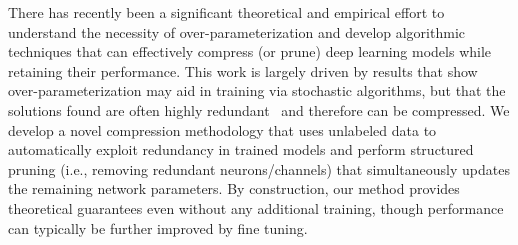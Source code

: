





There has recently been a significant theoretical and empirical effort to understand the necessity of over-parameterization and develop algorithmic techniques that can effectively compress (or prune) deep learning models while retaining their performance. This work is largely driven by results that show over-parameterization may aid in training via stochastic algorithms, but that the solutions found are often highly redundant~\cite{frankle2018lottery,frankle2020linear,jaderberg2014speeding,luo2017thinet} and therefore can be compressed. We develop a novel compression methodology that uses unlabeled data to automatically exploit redundancy in trained models and perform structured pruning (i.e., removing redundant neurons/channels) that simultaneously updates the remaining network parameters. By construction, our method provides theoretical guarantees even without any additional training, though performance can typically be further improved by fine tuning.

